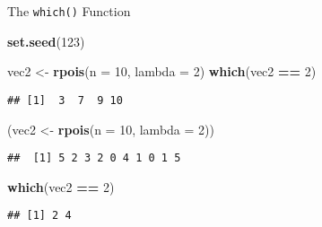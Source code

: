 \documentclass[ignorenonframetext,]{beamer}
\newenvironment{Shaded}{\begin{snugshade}}{\end{snugshade}}
\newcommand{\DataTypeTok}[1]{\textcolor[rgb]{0.13,0.29,0.53}{#1}}
\newcommand{\DecValTok}[1]{\textcolor[rgb]{0.00,0.00,0.81}{#1}}
\newcommand{\KeywordTok}[1]{\textcolor[rgb]{0.13,0.29,0.53}{\textbf{#1}}}
\newcommand{\NormalTok}[1]{#1}
\newcommand{\OperatorTok}[1]{\textcolor[rgb]{0.81,0.36,0.00}{\textbf{#1}}}
\newcommand{\StringTok}[1]{\textcolor[rgb]{0.31,0.60,0.02}{#1}}
\begin{document}
\begin{frame}[fragile]{The \texttt{which()} Function}
\protect\hypertarget{the-which-function-1}{}

\begin{Shaded}
\begin{Highlighting}[]
\KeywordTok{set.seed}\NormalTok{(}\DecValTok{123}\NormalTok{)}

\NormalTok{vec2 <-}\StringTok{ }\KeywordTok{rpois}\NormalTok{(}\DataTypeTok{n =} \DecValTok{10}\NormalTok{, }\DataTypeTok{lambda =} \DecValTok{2}\NormalTok{)}
\KeywordTok{which}\NormalTok{(vec2 }\OperatorTok{==}\StringTok{ }\DecValTok{2}\NormalTok{)}
\end{Highlighting}
\end{Shaded}

\begin{verbatim}
## [1]  3  7  9 10
\end{verbatim}

\begin{Shaded}
\begin{Highlighting}[]
\NormalTok{(vec2 <-}\StringTok{ }\KeywordTok{rpois}\NormalTok{(}\DataTypeTok{n =} \DecValTok{10}\NormalTok{, }\DataTypeTok{lambda =} \DecValTok{2}\NormalTok{)) }
\end{Highlighting}
\end{Shaded}

\begin{verbatim}
##  [1] 5 2 3 2 0 4 1 0 1 5
\end{verbatim}

\begin{Shaded}
\begin{Highlighting}[]
\KeywordTok{which}\NormalTok{(vec2 }\OperatorTok{==}\StringTok{ }\DecValTok{2}\NormalTok{)}
\end{Highlighting}
\end{Shaded}

\begin{verbatim}
## [1] 2 4
\end{verbatim}

\end{frame}
\end{document}
